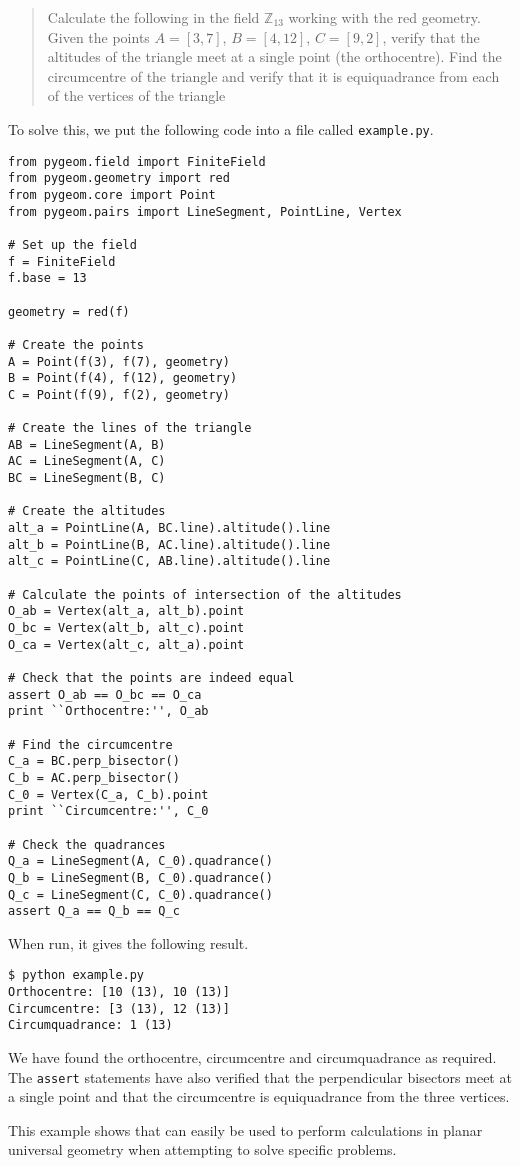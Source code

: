 \begin{quote}
Calculate the following in the field $\mathbb{Z}_{13}$ working with the red geometry.
Given the points $A = [3, 7]$, $B = [4, 12]$, $C = [9, 2]$, verify that the altitudes of the triangle meet at a single point (the orthocentre).
Find the circumcentre of the triangle and verify that it is equiquadrance from each of the vertices of the triangle
\end{quote}
To solve this, we put the following code into a file called \texttt{example.py}.
\begin{verbatim}
from pygeom.field import FiniteField
from pygeom.geometry import red
from pygeom.core import Point
from pygeom.pairs import LineSegment, PointLine, Vertex

# Set up the field
f = FiniteField
f.base = 13

geometry = red(f)

# Create the points
A = Point(f(3), f(7), geometry)
B = Point(f(4), f(12), geometry)
C = Point(f(9), f(2), geometry)

# Create the lines of the triangle
AB = LineSegment(A, B)
AC = LineSegment(A, C)
BC = LineSegment(B, C)

# Create the altitudes
alt_a = PointLine(A, BC.line).altitude().line
alt_b = PointLine(B, AC.line).altitude().line
alt_c = PointLine(C, AB.line).altitude().line

# Calculate the points of intersection of the altitudes
O_ab = Vertex(alt_a, alt_b).point
O_bc = Vertex(alt_b, alt_c).point
O_ca = Vertex(alt_c, alt_a).point

# Check that the points are indeed equal
assert O_ab == O_bc == O_ca
print ``Orthocentre:'', O_ab

# Find the circumcentre
C_a = BC.perp_bisector()
C_b = AC.perp_bisector()
C_0 = Vertex(C_a, C_b).point
print ``Circumcentre:'', C_0

# Check the quadrances
Q_a = LineSegment(A, C_0).quadrance()
Q_b = LineSegment(B, C_0).quadrance()
Q_c = LineSegment(C, C_0).quadrance()
assert Q_a == Q_b == Q_c
\end{verbatim}
When run, it gives the following result.
\begin{verbatim}
$ python example.py
Orthocentre: [10 (13), 10 (13)]
Circumcentre: [3 (13), 12 (13)]
Circumquadrance: 1 (13)
\end{verbatim}
We have found the orthocentre, circumcentre and circumquadrance as required.
The \texttt{assert} statements have also verified that the perpendicular bisectors meet at a single point and that the circumcentre is equiquadrance from the three vertices.

This example shows that \pygeom can easily be used to perform calculations in planar universal geometry when attempting to solve specific problems.

